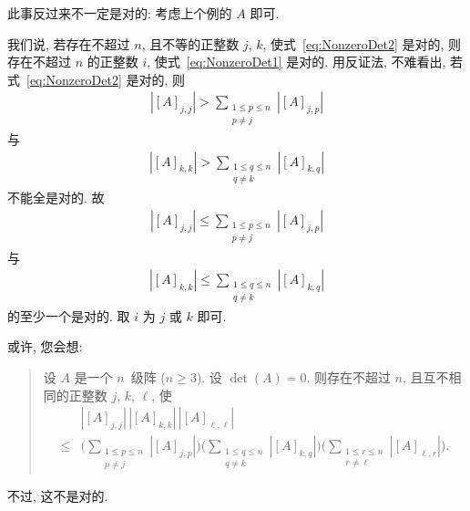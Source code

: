 \documentclass[../libro.tex]{subfiles}
\begin{document}
此事反过来不一定是对的:
考虑上个例的 \(A\) 即可.

我们说, 若存在不超过 \(n\), 且不等的正整数 \(j\), \(k\),
使式~\eqref{eq:NonzeroDet2} 是对的,
则存在不超过 \(n\) 的正整数 \(i\),
使式~\eqref{eq:NonzeroDet1} 是对的.
用反证法, 不难看出, 若式~\eqref{eq:NonzeroDet2} 是对的,
则
\begin{align*}
    |[A]_{j,j}| >
    \sum_{\substack{1 \leq p \leq n \\
    p \neq j}} {|[A]_{j,p}|}
\end{align*}
与
\begin{align*}
    |[A]_{k,k}| >
    \sum_{\substack{1 \leq q \leq n \\
    q \neq k}} {|[A]_{k,q}|}
\end{align*}
不能全是对的.
故
\begin{align*}
    |[A]_{j,j}| \leq
    \sum_{\substack{1 \leq p \leq n \\
    p \neq j}} {|[A]_{j,p}|}
\end{align*}
与
\begin{align*}
    |[A]_{k,k}| \leq
    \sum_{\substack{1 \leq q \leq n \\
    q \neq k}} {|[A]_{k,q}|}
\end{align*}
的至少一个是对的.
取 \(i\) 为 \(j\) 或 \(k\) 即可.

\vspace{2ex}

或许, 您会想:
\begin{quotation}
    设 \(A\) 是一个 \(n\)~级阵 (\(n \geq 3\)).
    设 \(\det {(A)} = 0\).
    则存在不超过 \(n\),
    且互不相同的正整数 \(j\), \(k\), \(\ell\), 使
    \begin{align*}
        &
        |[A]_{j,j}|\,|[A]_{k,k}|\, |[A]_{\ell,\ell}|
        \\
        \leq {} &
        \Bigg(
            \sum_{\substack{1 \leq p \leq n \\
            p \neq j}} {|[A]_{j,p}|}
        \Bigg)
        \Bigg(
            \sum_{\substack{1 \leq q \leq n \\
            q \neq k}} {|[A]_{k,q}|}
        \Bigg)
        \Bigg(
            \sum_{\substack{1 \leq r \leq n \\
            r \neq \ell}} {|[A]_{\ell,r}|}
        \Bigg).
    \end{align*}
\end{quotation}
不过, 这不是对的.
\end{document}
